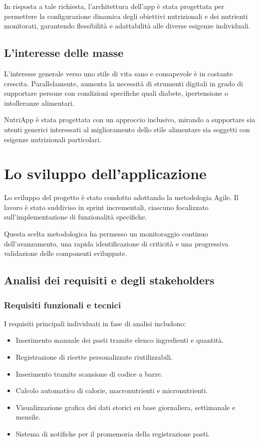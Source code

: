 \documentclass[a4paper,12pt]{article}
\begin{document}
    In risposta a tale richiesta, l'architettura dell'app è stata progettata per permettere la configurazione dinamica degli obiettivi nutrizionali e dei nutrienti monitorati, garantendo flessibilità e adattabilità alle diverse esigenze individuali.

    \subsection{L'interesse delle masse}

    L'interesse generale verso uno stile di vita sano e consapevole è in costante crescita. Parallelamente, aumenta la necessità di strumenti digitali in grado di supportare persone con condizioni specifiche quali diabete, ipertensione o intolleranze alimentari.

    NutriApp è stata progettata con un approccio inclusivo, mirando a supportare sia utenti generici interessati al miglioramento dello stile alimentare sia soggetti con esigenze nutrizionali particolari.

    \section{Lo sviluppo dell'applicazione}

    Lo sviluppo del progetto è stato condotto adottando la metodologia Agile. Il lavoro è stato suddiviso in sprint incrementali, ciascuno focalizzato sull'implementazione di funzionalità specifiche.

    Questa scelta metodologica ha permesso un monitoraggio continuo dell'avanzamento, una rapida identificazione di criticità e una progressiva validazione delle componenti sviluppate.

    \subsection{Analisi dei requisiti e degli stakeholders}

    \subsubsection{Requisiti funzionali e tecnici}

    I requisiti principali individuati in fase di analisi includono:

    \begin{itemize}
        \item Inserimento manuale dei pasti tramite elenco ingredienti e quantità.
        \item Registrazione di ricette personalizzate riutilizzabili.
        \item Inserimento tramite scansione di codice a barre.
        \item Calcolo automatico di calorie, macronutrienti e micronutrienti.
        \item Visualizzazione grafica dei dati storici su base giornaliera, settimanale e mensile.
        \item Sistema di notifiche per il promemoria della registrazione pasti.
    \end{itemize}
\end{document}
